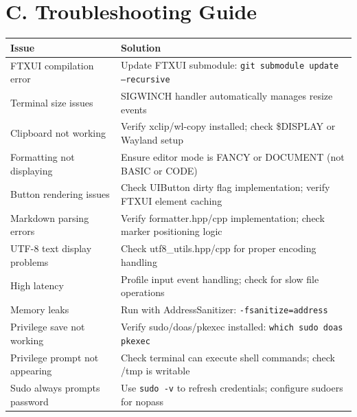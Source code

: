 \documentclass[12pt,a4paper,oneside,openany]{report}
\begin{document}
\section*{C. Troubleshooting Guide}

\begin{table}[H]
	\centering
	\begin{tabular}{|p{4cm}|p{7cm}|}
		\hline
		\textbf{Issue}              & \textbf{Solution}                                                       \\
		\hline
		FTXUI compilation error     & Update FTXUI submodule: \texttt{git submodule update --recursive}       \\
		\hline
		Terminal size issues        & SIGWINCH handler automatically manages resize events                    \\
		\hline
		Clipboard not working       & Verify xclip/wl-copy installed; check \$DISPLAY or Wayland setup        \\
		\hline
		Formatting not displaying   & Ensure editor mode is FANCY or DOCUMENT (not BASIC or CODE)             \\
		\hline
		Button rendering issues     & Check UIButton dirty flag implementation; verify FTXUI element caching  \\
		\hline
		Markdown parsing errors     & Verify formatter.hpp/cpp implementation; check marker positioning logic \\
		\hline
		UTF-8 text display problems & Check utf8\_utils.hpp/cpp for proper encoding handling                  \\
		\hline
		High latency                & Profile input event handling; check for slow file operations            \\
		\hline
		Memory leaks                & Run with AddressSanitizer: \texttt{-fsanitize=address}                  \\
		\hline
		Privilege save not working  & Verify sudo/doas/pkexec installed: \texttt{which sudo doas pkexec}      \\
		\hline
		Privilege prompt not appearing & Check terminal can execute shell commands; check /tmp is writable      \\
		\hline
		Sudo always prompts password & Use \texttt{sudo -v} to refresh credentials; configure sudoers for nopass \\
		\hline
	\end{tabular}
\end{table}

\end{document}
